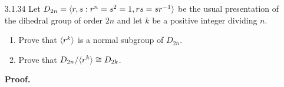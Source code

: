 \begin{enumerate}
      \textbf{Proof.} The normal subgroups 1 and $D_8$ of $D_8$ corresponds to
      the quotient groups $D_8/1 \cong D_8$ and $D_8/D_8 \cong 1$, respectively.
      First observe that $\{r, s\}$ generates $D_8$; now since
      $rsr^{-1} = r^2s \notin \cyc{s}$, $r(r^2s)r^{-1} = s \notin \cyc{r^2s}$,
      $r(rs)r^{-1} = r^3s \notin \cyc{rs}$,
      $r(r^3s)r^{-1} = rs \notin \cyc{r^3s}$, it follows by Exercise 29 that 
      that these subgroups of $D_8$ are not normal: $\cyc{s}$, $\cyc{r^2s}$,
      $\cyc{rs}$, $\cyc{r^3s}$. By Exercise 2.2.7(b), $Z(D_8) = \cyc{r^2}$, so
      that $\cyc{r^2} \trianglelefteq D_8$. Now
      \begin{align*}
         r\{s, r^2\}r^{-1} &= \{r^2s, r^2\} \subseteq \cyc{s, r^2}
            &s\{s, r^2\}s^{-1} &= \{s, r^2\} \subseteq \cyc{s, r^2} \\
         r\{r\}r^{-1} &= \{r\} \subseteq \cyc{r}
            &s\{r\}s^{-1} &= \{r^3\} \subseteq \cyc{r} \\
         r\{rs, r^2\}r^{-1} &= \{r^3s, r^2\} \subseteq \cyc{rs, r^2}
            &s\{rs, r^2\}s^{-1} &= \{r^3s, r^2\} \subseteq \cyc{rs, r^2}.
      \end{align*}
      Conclude by Exercise 29 that the subgroups $\cyc{s, r^2}$, $\cyc{r}$, and
      $\cyc{rs, r^2}$ are normal in $D_8$. Now
      $$D_8/\cyc{s, r^2} \cong D_8/\cyc{r} \cong D_8/\cyc{rs, r^2} \cong Z_2,$$
      because $|\cyc{s, r^2}| = |\cyc{r}| = |\cyc{rs, r^2}| = 4$. Finally,
      $D_8/\cyc{r^2} = \{\m{1}, \m{r}, \m{s}, \m{rs}\} \cong V_4$ because
      each element in $D_8/\cyc{r^2}$ has order 2 (Exercise 2.5.10). \qed
   \item[3.1.34]  Let $D_{2n} = \langle r, s : r^n = s^2 = 1, rs = sr^{-1} \rangle$ be the
                  usual presentation of the dihedral group of order $2n$ and let
                  $k$ be a positive integer dividing $n$.
                  \begin{enumerate}
                     \item Prove that $\langle r^k \rangle$ is a normal subgroup of
                           $D_{2n}$.
                     \item Prove that $D_{2n}/\langle r^k \rangle \cong D_{2k}$.
                  \end{enumerate}

      \textbf{Proof.}


\end{enumerate}
